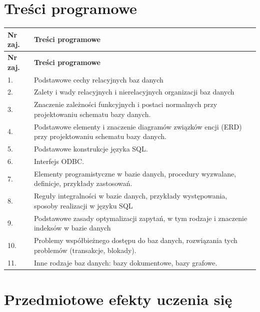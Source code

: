 \documentclass[12pt, a4paper]{article}
\newcommand{\thdrule}{\noalign{\global\setlength{\extrarowheight}{0pt}}}
\newcommand{\thdend}{\noalign{\global\setlength{\extrarowheight}{3pt}}}
\begin{document}
\section{Treści programowe}

{\scriptsize
\begin{longtable}{m{1.5cm}m{14.5cm}}
\thdrule\toprule
\rowcolor{pjatkRed} {\color{white}\textbf{Nr zaj.}} & {\color{white}\textbf{Treści programowe}} \\
\midrule\thdend
\endfirsthead
\thdrule\toprule
\rowcolor{pjatkRed} {\color{white}\textbf{Nr zaj.}} & {\color{white}\textbf{Treści programowe}} \\
\midrule\thdend
\endhead
  \rowcolor{tableRowLight} 1. & Podstawowe cechy relacyjnych baz danych \\
  \rowcolor{tableRowAlt} 2. & Zalety i wady relacyjnych i nierelacyjnych organizacji baz danych \\
  \rowcolor{tableRowLight} 3. & Znaczenie zależności funkcyjnych i postaci normalnych przy projektowaniu schematu bazy danych. \\
  \rowcolor{tableRowAlt} 4. & Podstawowe elementy i znaczenie diagramów związków encji (ERD) przy projektowaniu schematu bazy danych. \\
  \rowcolor{tableRowLight} 5. & Podstawowe konstrukcje języka SQL. \\
  \rowcolor{tableRowAlt} 6. & Interfejs ODBC. \\
  \rowcolor{tableRowLight} 7. & Elementy programistyczne w bazie danych, procedury wyzwalane, definicje, przykłady zastosowań. \\
  \rowcolor{tableRowAlt} 8. & Reguły integralności w bazie danych, przykłady występowania, sposoby realizacji w języku SQL \\
  \rowcolor{tableRowLight} 9. & Podstawowe zasady optymalizacji zapytań, w tym rodzaje i znaczenie indeksów w bazie danych \\
  \rowcolor{tableRowAlt} 10. & Problemy współbieżnego dostępu do baz danych, rozwiązania tych problemów (transakcje, blokady). \\
  \rowcolor{tableRowLight} 11. & Inne rodzaje baz danych: bazy dokumentowe, bazy grafowe. \\
\bottomrule
\end{longtable}}

\section{Przedmiotowe efekty uczenia się}
\end{document}

